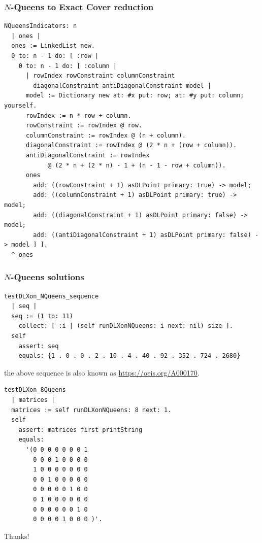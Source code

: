 \documentclass{beamer}
\begin{document}
\begin{frame}[fragile]
\frametitle{$N$-Queens to Exact Cover reduction}
\begin{verbatim}
NQueensIndicators: n
  | ones |
  ones := LinkedList new.
  0 to: n - 1 do: [ :row | 
    0 to: n - 1 do: [ :column | 
      | rowIndex rowConstraint columnConstraint 
        diagonalConstraint antiDiagonalConstraint model |
      model := Dictionary new at: #x put: row; at: #y put: column; yourself.
      rowIndex := n * row + column.
      rowConstraint := rowIndex @ row.
      columnConstraint := rowIndex @ (n + column).
      diagonalConstraint := rowIndex @ (2 * n + (row + column)).
      antiDiagonalConstraint := rowIndex
            @ (2 * n + (2 * n) - 1 + (n - 1 - row + column)).
      ones
        add: ((rowConstraint + 1) asDLPoint primary: true) -> model;
        add: ((columnConstraint + 1) asDLPoint primary: true) -> model;
        add: ((diagonalConstraint + 1) asDLPoint primary: false) -> model;
        add: ((antiDiagonalConstraint + 1) asDLPoint primary: false) -> model ] ].
  ^ ones
\end{verbatim}
\end{frame}

\begin{frame}[fragile]
\frametitle{$N$-Queens solutions}
\begin{verbatim}
testDLXon_NQueens_sequence
  | seq |
  seq := (1 to: 11)
    collect: [ :i | (self runDLXonNQueens: i next: nil) size ].
  self
    assert: seq
    equals: {1 . 0 . 0 . 2 . 10 . 4 . 40 . 92 . 352 . 724 . 2680}
\end{verbatim}
the above sequence is also known as \url{https://oeis.org/A000170}.
\begin{verbatim}
testDLXon_8Queens
  | matrices |
  matrices := self runDLXonNQueens: 8 next: 1.
  self
    assert: matrices first printString
    equals:
      '(0 0 0 0 0 0 0 1
        0 0 0 1 0 0 0 0
        1 0 0 0 0 0 0 0
        0 0 1 0 0 0 0 0
        0 0 0 0 0 1 0 0
        0 1 0 0 0 0 0 0
        0 0 0 0 0 0 1 0
        0 0 0 0 1 0 0 0 )'.
\end{verbatim}

\end{frame}


\begin{frame}{ }
\Huge Thanks!
\end{frame}
\end{document}
